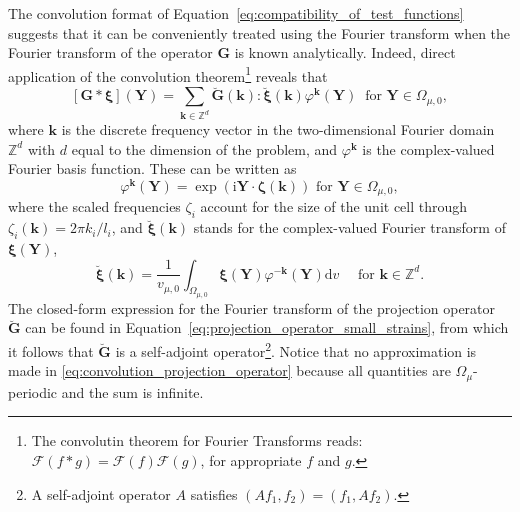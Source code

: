 The convolution format of Equation~\eqref{eq:compatibility_of_test_functions} suggests that it can be conveniently treated using the Fourier transform when the Fourier transform of the operator \(\bm G\) is known analytically.
Indeed, direct application of the convolution theorem\footnote{The convolutin theorem for Fourier Transforms reads: \(\mathcal F(f*g) = \mathcal F(f)\mathcal F(g)\), for appropriate \(f\) and \(g\).} reveals that
\begin{equation}\label{eq:convolution_projection_operator}
[\bm{G} * \bm{\xi}](\bm{Y})=\sum_{\bm{k} \in \mathbb{Z}^{d}} \breve{\bm{G} }(\bm{k}): \breve{\bm{\xi}}(\bm{k}) \varphi^{\bm{k} }(\bm{Y})\ \text { for } \bm{Y} \in \Omega_{\mu,0},
\end{equation}
where \(\bm k\) is the discrete frequency vector in the two-dimensional Fourier domain \(\mathbb{Z}^{d}\) with \(d\) equal to the dimension of the problem, and \(\varphi^{\bm k}\) is the complex-valued Fourier basis function.
These can be written as
\begin{equation} \label{eq:fourier_basis_functions}
\varphi^{\bm k}(\bm{Y})=\exp \left( \mathrm{i}\bm Y\cdot \bm \zeta(\bm k)\right) \text { for } \bm{Y} \in \Omega_{\mu,0},
\end{equation}
where the scaled frequencies \(\zeta_i\) account for the size of the unit cell through \(\zeta_i(\bm k) = 2 \pi k_i/l_i\),
and \(\breve{\bm \xi}(\bm{k})\) stands for the complex-valued Fourier transform of \(\bm{\xi}(\bm{Y})\),
\begin{equation}
\breve{\bm\xi}(\bm{k})=\frac{1}{v_{\mu,0}} \int_{\Omega_{\mu,0}} \bm{\xi}(\bm{Y}) \varphi^{-\bm{k}}(\bm{Y}) \mathrm{d} v\quad \text { for } \bm{k} \in \mathbb{Z}^{d}.
\end{equation}
The closed-form expression for the Fourier transform of the projection operator \(\breve{\bm G}\) can be found in Equation~\eqref{eq:projection_operator_small_strains}, from which it follows that \(\breve{\bm G}\) is a self-adjoint operator\footnote{A self-adjoint operator \(A\) satisfies \((Af_1,f_2)=(f_1, Af_2)\).}.
Notice that no approximation is made in \eqref{eq:convolution_projection_operator} because all quantities are \(\Omega_{\mu}\)-periodic and the sum is infinite.

